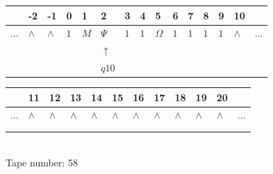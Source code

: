 \documentclass[11pt]{article}
\begin{document}
\begin{table}[H]
\centering
\begin{tabular}{lllllllllllllll}
 & -2 & -1 & 0 & 1 & 2 & 3 & 4 & 5 & 6 & 7 & 8 & 9 & 10 & \\
\hline
$...$ & \multicolumn{1}{|l|}{$\wedge$} & \multicolumn{1}{|l|}{$\wedge$} & \multicolumn{1}{|l|}{$1$} & \multicolumn{1}{|l|}{$M$} & \multicolumn{1}{|l|}{$\Psi$} & \multicolumn{1}{|l|}{$1$} & \multicolumn{1}{|l|}{$1$} & \multicolumn{1}{|l|}{$\Omega$} & \multicolumn{1}{|l|}{$1$} & \multicolumn{1}{|l|}{$1$} & \multicolumn{1}{|l|}{$1$} & \multicolumn{1}{|l|}{$1$} & \multicolumn{1}{|l|}{$\wedge$} & $...$\\
\hline
&  &  &  &  & $\uparrow$ &  &  &  &  &  &  &  &  &  \\
&  &  &  &  & $ q10 $ &  &  &  &  &  &  &  &  &  \\
\end{tabular}
\begin{tabular}{llllllllllll}
 & 11 & 12 & 13 & 14 & 15 & 16 & 17 & 18 & 19 & 20 & \\
\hline
$...$ & \multicolumn{1}{|l|}{$\wedge$} & \multicolumn{1}{|l|}{$\wedge$} & \multicolumn{1}{|l|}{$\wedge$} & \multicolumn{1}{|l|}{$\wedge$} & \multicolumn{1}{|l|}{$\wedge$} & \multicolumn{1}{|l|}{$\wedge$} & \multicolumn{1}{|l|}{$\wedge$} & \multicolumn{1}{|l|}{$\wedge$} & \multicolumn{1}{|l|}{$\wedge$} & \multicolumn{1}{|l|}{$\wedge$} & $...$\\
\hline
&  &  &  &  &  &  &  &  &  &  &  \\
&  &  &  &  &  &  &  &  &  &  &  \\
\end{tabular}
\\
Tape number: 58
\noindent\makebox[\linewidth]{\hdashrule{\textwidth}{1pt}{1pt}}\end{table}
\end{document}
